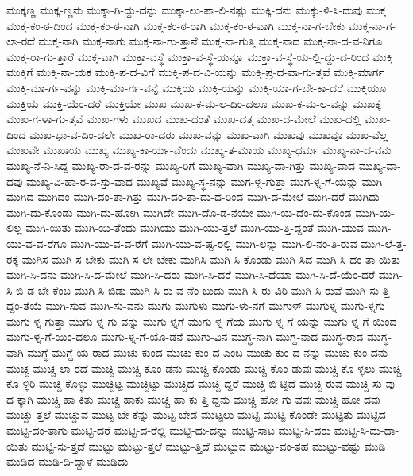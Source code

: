{ಮುಕ್ಕಣ್ಣ
ಮುಕ್ಕ-ಣ್ಣನು
ಮುಕ್ಕಾ-ಗಿ-ದ್ದು-ದನ್ನು
ಮುಕ್ಕಾ-ಲು-ಪಾ-ಲಿ-ನಷ್ಟು
ಮುಕ್ಕಿ-ದನು
ಮುಕ್ಕು-ಳಿ-ಸಿ-ದುವು
ಮುಕ್ತ
ಮುಕ್ತ-ಕಂ-ಠ-ದಿಂದ
ಮುಕ್ತ-ಕಂ-ಠ-ನಾಗಿ
ಮುಕ್ತ-ಕಂ-ಠ-ರಾಗಿ
ಮುಕ್ತ-ಕಂ-ಠ-ವಾಗಿ
ಮುಕ್ತ-ನಾ-ಗ-ಬೇಕು
ಮುಕ್ತ-ನಾ-ಗ-ಲಾ-ರದೆ
ಮುಕ್ತ-ನಾಗಿ
ಮುಕ್ತ-ನಾಗು
ಮುಕ್ತ-ನಾ-ಗು-ತ್ತಾನೆ
ಮುಕ್ತ-ನಾ-ಗುತ್ತಿ
ಮುಕ್ತ-ನಾದ
ಮುಕ್ತ-ನಾ-ದ-ವ-ನಿಗೂ
ಮುಕ್ತ-ರಾ-ಗು-ತ್ತಾರೆ
ಮುಕ್ತ-ವಾಗಿ
ಮುಕ್ತಾ-ವಸ್ಥೆ
ಮುಕ್ತಾ-ವ-ಸ್ಥೆ-ಯನ್ನೂ
ಮುಕ್ತಾ-ವ-ಸ್ಥೆ-ಯ-ಲ್ಲಿ-ದ್ದು-ದ-ರಿಂದ
ಮುಕ್ತಿ
ಮುಕ್ತಿಗೆ
ಮುಕ್ತಿ-ನಾ-ಯಕ
ಮುಕ್ತಿ-ಪ-ದ-ವಿಗೆ
ಮುಕ್ತಿ-ಪ-ದ-ವಿ-ಯನ್ನು
ಮುಕ್ತಿ-ಪ್ರ-ದ-ವಾ-ಗು-ತ್ತವೆ
ಮುಕ್ತಿ-ಮಾರ್ಗ
ಮುಕ್ತಿ-ಮಾ-ರ್ಗ-ವನ್ನು
ಮುಕ್ತಿ-ಮಾ-ರ್ಗ-ವನ್ನೆ
ಮುಕ್ತಿಯ
ಮುಕ್ತಿ-ಯನ್ನು
ಮುಕ್ತಿ-ಯಾ-ಗ-ಬೇ-ಕಾ-ದರೆ
ಮುಕ್ತಿಯೂ
ಮುಕ್ತಿಯೆ
ಮುಕ್ತಿ-ಯೆಂ-ದರೆ
ಮುಕ್ತಿಯೇ
ಮುಖ
ಮುಖ-ಕ-ಮ-ಲ-ದಿಂ-ದಲೂ
ಮುಖ-ಕ-ಮ-ಲ-ವನ್ನು
ಮುಖಕ್ಕೆ
ಮುಖ-ಗ-ಳಾ-ಗು-ತ್ತವೆ
ಮುಖ-ಗಳು
ಮುಖದ
ಮುಖ-ದಂತೆ
ಮುಖ-ದತ್ತ
ಮುಖ-ದ-ಮೇಲೆ
ಮುಖ-ದಲ್ಲಿ
ಮುಖ-ದಿಂದ
ಮುಖ-ಭಾ-ವ-ದಿಂ-ದಲೇ
ಮುಖ-ರಾ-ದರು
ಮುಖ-ವನ್ನು
ಮುಖ-ವಾಗಿ
ಮುಖವು
ಮುಖವೂ
ಮುಖ-ವೆಲ್ಲ
ಮುಖವೇ
ಮುಖಾಯ
ಮುಖ್ಯ
ಮುಖ್ಯ-ಕಾ-ರ್ಯ-ವೆಂದು
ಮುಖ್ಯ-ತ-ಮಾಯ
ಮುಖ್ಯ-ಧರ್ಮ
ಮುಖ್ಯ-ನಾ-ದ-ವನು
ಮುಖ್ಯ-ನೆ-ನಿ-ಸಿದ್ದ
ಮುಖ್ಯ-ರಾ-ದ-ವ-ರನ್ನು
ಮುಖ್ಯ-ರಿಗೆ
ಮುಖ್ಯ-ವಾಗಿ
ಮುಖ್ಯ-ವಾ-ಗಿತ್ತು
ಮುಖ್ಯ-ವಾದ
ಮುಖ್ಯ-ವಾ-ದವು
ಮುಖ್ಯ-ವಿ-ಹಾ-ರ-ವ-ಸ್ತು-ವಾದ
ಮುಖ್ಯವೆ
ಮುಖ್ಯ-ಸ್ಥ-ನನ್ನು
ಮುಗ-ಳ್ನ-ಗುತ್ತಾ
ಮುಗ-ಳ್ನ-ಗೆ-ಯನ್ನು
ಮುಗಿ
ಮುಗಿದ
ಮುಗಿದಂ
ಮುಗಿ-ದಂ-ತಾ-ಗಿತ್ತು
ಮುಗಿ-ದಂ-ತಾ-ದು-ದ-ರಿಂದ
ಮುಗಿ-ದ-ಮೇಲೆ
ಮುಗಿ-ದರೆ
ಮುಗಿದು
ಮುಗಿ-ದು-ಕೊಂಡು
ಮುಗಿ-ದು-ಹೋಗಿ
ಮುಗಿದೇ
ಮುಗಿ-ದೊ-ಡ-ನೆಯೇ
ಮುಗಿ-ಯ-ದೆಂ-ದು-ಕೊಂಡ
ಮುಗಿ-ಯ-ಲಿಲ್ಲ
ಮುಗಿ-ಯಿತು
ಮುಗಿ-ಯಿ-ತೆಂದು
ಮುಗಿಯು
ಮುಗಿ-ಯು-ತ್ತಲೆ
ಮುಗಿ-ಯು-ತ್ತಿ-ದ್ದಂತೆ
ಮುಗಿ-ಯುವ
ಮುಗಿ-ಯು-ವ-ವ-ರೆಗೂ
ಮುಗಿ-ಯು-ವ-ವ-ರೆಗೆ
ಮುಗಿ-ಯು-ವ-ಷ್ಟ-ರಲ್ಲಿ
ಮುಗಿ-ಲನ್ನು
ಮುಗಿ-ಲಿ-ನಂ-ತಿ-ರುವ
ಮುಗಿ-ಲೆ-ತ್ತ-ರಕ್ಕೆ
ಮುಗಿಸ
ಮುಗಿ-ಸ-ಬೇಕು
ಮುಗಿ-ಸ-ಲೇ-ಬೇಕು
ಮುಗಿಸಿ
ಮುಗಿ-ಸಿ-ಕೊಂಡು
ಮುಗಿ-ಸಿದ
ಮುಗಿ-ಸಿ-ದಂ-ತಾ-ಯಿತು
ಮುಗಿ-ಸಿ-ದನು
ಮುಗಿ-ಸಿ-ದ-ಮೇಲೆ
ಮುಗಿ-ಸಿ-ದರು
ಮುಗಿ-ಸಿ-ದರೆ
ಮುಗಿ-ಸಿ-ದೆಯಾ
ಮುಗಿ-ಸಿ-ದೆ-ಯೆಂ-ದರೆ
ಮುಗಿ-ಸಿ-ಬಿ-ಡ-ಬೇ-ಕೆಂಬ
ಮುಗಿ-ಸಿ-ಬಿಡು
ಮುಗಿ-ಸಿ-ರು-ವ-ನೆಂ-ಬುದು
ಮುಗಿ-ಸಿ-ರು-ವಿರಿ
ಮುಗಿ-ಸಿ-ರುವೆ
ಮುಗಿ-ಸು-ತ್ತಿ-ದ್ದಂ-ತೆಯೆ
ಮುಗಿ-ಸುವ
ಮುಗಿ-ಸು-ವನು
ಮುಗು
ಮುಗುಳು
ಮುಗು-ಳು-ನಗೆ
ಮುಗುಳ್
ಮುಗುಳ್ನ
ಮುಗು-ಳ್ನಗು
ಮುಗು-ಳ್ನ-ಗುತ್ತಾ
ಮುಗು-ಳ್ನ-ಗು-ವನ್ನು
ಮುಗು-ಳ್ನಗೆ
ಮುಗು-ಳ್ನ-ಗೆಯ
ಮುಗು-ಳ್ನ-ಗೆ-ಯನ್ನು
ಮುಗು-ಳ್ನ-ಗೆ-ಯಿಂದ
ಮುಗು-ಳ್ನ-ಗೆ-ಯಿಂ-ದಲೂ
ಮುಗು-ಳ್ನ-ಗೆ-ಯೊ-ಡನೆ
ಮುಗು-ವಿನ
ಮುಗ್ಧ-ನಾಗಿ
ಮುಗ್ಧ-ನಾದ
ಮುಗ್ಧ-ರಾದ
ಮುಗ್ಧ-ವಾಗಿ
ಮುಗ್ಧೆ
ಮುಗ್ಧೆ-ಯ-ರಾದ
ಮುಚು-ಕುಂದ
ಮುಚು-ಕುಂ-ದ-ಎಂಬ
ಮುಚು-ಕುಂ-ದ-ನನ್ನು
ಮುಚು-ಕುಂ-ದನು
ಮುಚ್ಚ
ಮುಚ್ಚ-ಲಾ-ರದೆ
ಮುಚ್ಚಿ
ಮುಚ್ಚಿ-ಕೊಂ-ಡನು
ಮುಚ್ಚಿ-ಕೊಂಡು
ಮುಚ್ಚಿ-ಕೊಂ-ಡುವು
ಮುಚ್ಚಿ-ಕೊ-ಳ್ಳಲು
ಮುಚ್ಚಿ-ಕೊ-ಳ್ಳಿರಿ
ಮುಚ್ಚಿ-ಕೊಳ್ಳು
ಮುಚ್ಚಿಟ್ಟ
ಮುಚ್ಚಿಟ್ಟು
ಮುಚ್ಚಿದ
ಮುಚ್ಚಿ-ದ್ದರೆ
ಮುಚ್ಚಿ-ಬಿ-ಟ್ಟಿದೆ
ಮುಚ್ಚಿ-ರುವ
ಮುಚ್ಚಿ-ಸು-ವು-ದ-ಕ್ಕಾಗಿ
ಮುಚ್ಚಿ-ಹಾ-ಕಿತು
ಮುಚ್ಚಿ-ಹಾಕು
ಮುಚ್ಚಿ-ಹಾ-ಕು-ತ್ತಿ-ದ್ದನು
ಮುಚ್ಚಿ-ಹೋ-ಗು-ವವು
ಮುಚ್ಚಿ-ಹೋ-ದವು
ಮುಚ್ಚು-ತ್ತಲೆ
ಮುಚ್ಚುವ
ಮುಟ್ಟ-ಬೇ-ಕೆನ್ನು
ಮುಟ್ಟ-ಬೇಡ
ಮುಟ್ಟಲು
ಮುಟ್ಟಿ
ಮುಟ್ಟಿ-ಕೊಂಡೇ
ಮುಟ್ಟಿತು
ಮುಟ್ಟಿದ
ಮುಟ್ಟಿ-ದಂ-ತಾಗು
ಮುಟ್ಟಿ-ದರೆ
ಮುಟ್ಟಿ-ದ-ರೆಲ್ಲಿ
ಮುಟ್ಟಿ-ದು-ದನ್ನು
ಮುಟ್ಟಿ-ಸಾಟ
ಮುಟ್ಟಿ-ಸಿ-ದರು
ಮುಟ್ಟಿ-ಸಿ-ದು-ದಾ-ಯಿತು
ಮುಟ್ಟಿ-ಸು-ತ್ತದೆ
ಮುಟ್ಟು
ಮುಟ್ಟು-ತ್ತಲೆ
ಮುಟ್ಟು-ತ್ತಿದೆ
ಮುಟ್ಟುವ
ಮುಟ್ಟು-ವಂ-ತಹ
ಮುಟ್ಟು-ವಷ್ಟು
ಮುಡಿ
ಮುಡಿದ
ಮುಡಿ-ದಿ-ದ್ದಾಳೆ
ಮುಡಿದು
}
